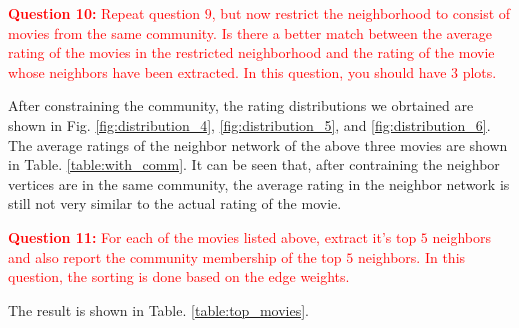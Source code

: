 \documentclass[11pt]{article}
\begin{document}
\textcolor{red}{\textbf{Question 10:} Repeat question $9$, but now restrict the neighborhood to consist of movies from the same community. Is there a better match between the average rating of the movies in the restricted neighborhood and the rating of the movie whose neighbors have been extracted. In this question, you should have $3$ plots.}

After constraining the community, the rating distributions we obrtained are shown in Fig. \ref{fig:distribution_4}, \ref{fig:distribution_5}, and \ref{fig:distribution_6}. The average ratings of the neighbor network of the above three movies are shown in Table. \ref{table:with_comm}. It can be seen that, after contraining the neighbor vertices are in the same community, the average rating in the neighbor network is still not very similar to the actual rating of the movie.

\begin{table}[H]
\center
\caption{Average rating vs. actual rating of the three movies, with community considered}
\label{table:with_comm}
\end{table}

\textcolor{red}{\textbf{Question 11:} For each of the movies listed above, extract it's top $5$ neighbors and also report the community membership of the top $5$ neighbors. In this question, the sorting is done based on the edge weights.}

The result is shown in Table. \ref{table:top_movies}.
\end{document}
